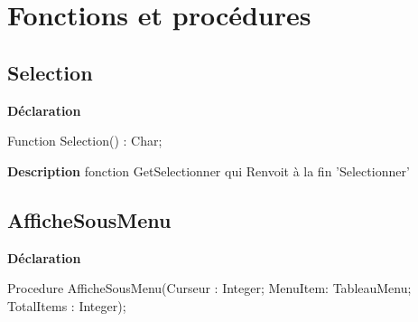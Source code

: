 \documentclass{report}
\newif\ifpdf
\begin{document}
\section{Fonctions et procédures}
\ifpdf
\subsection*{\large{\textbf{Selection}}\normalsize\hspace{1ex}\hrulefill}
\else
\subsection*{Selection}
\fi
\label{LesMenus-Selection}
\begin{list}{}{
\setlength{\itemindent}{0cm}
\setlength{\listparindent}{0cm}
\setlength{\leftmargin}{\evensidemargin}
\addtolength{\leftmargin}{\tmplength}
\settowidth{\labelsep}{X}
\addtolength{\leftmargin}{\labelsep}
\setlength{\labelwidth}{\tmplength}
}
\item[\textbf{Déclaration}\hfill]
\ifpdf
\begin{flushleft}
\fi
\begin{ttfamily}
Function Selection() : Char;\end{ttfamily}

\ifpdf
\end{flushleft}
\fi

\par
\item[\textbf{Description}]
fonction GetSelectionner qui Renvoit à la fin 'Selectionner'

\end{list}
\ifpdf
\subsection*{\large{\textbf{AfficheSousMenu}}\normalsize\hspace{1ex}\hrulefill}
\else
\subsection*{AfficheSousMenu}
\fi
\label{LesMenus-AfficheSousMenu}
\begin{list}{}{
\setlength{\itemindent}{0cm}
\setlength{\listparindent}{0cm}
\setlength{\leftmargin}{\evensidemargin}
\addtolength{\leftmargin}{\tmplength}
\settowidth{\labelsep}{X}
\addtolength{\leftmargin}{\labelsep}
\setlength{\labelwidth}{\tmplength}
}
\item[\textbf{Déclaration}\hfill]
\ifpdf
\begin{flushleft}
\fi
\begin{ttfamily}
Procedure AfficheSousMenu(Curseur : Integer; MenuItem: TableauMenu; TotalItems : Integer);\end{ttfamily}

\ifpdf
\end{flushleft}
\fi

\end{list}
\ifpdf
\end{document}
